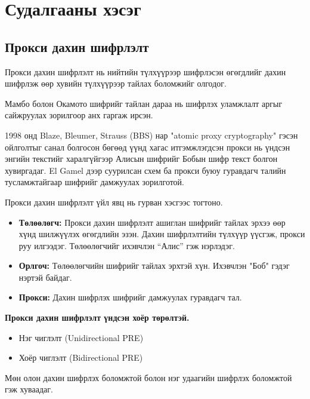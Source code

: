 \chapter{Судалгааны хэсэг}
\label{Chapter2} %
\pagecolor{white}

\section{Прокси дахин шифрлэлт}
Прокси дахин шифрлэлт нь нийтийн түлхүүрээр шифрлэсэн өгөгдлийг дахин шифрлэж өөр хувийн түлхүүрээр тайлах боломжийг олгодог.

Мамбо болон Окамото шифрийг тайлан дараа нь шифрлэх уламжлалт аргыг сайжруулах зорилгоор анх гаргаж ирсэн.

1998 онд Blaze, Bleumer, Strauss (BBS) нар "atomic proxy cryptography" гэсэн ойлголтыг санал болгосон бөгөөд үүнд хагас итгэмжлэгдсэн прокси нь үндсэн энгийн текстийг харалгүйгээр Алисын шифрийг Бобын шифр текст болгон хувиргадаг. El Gamel дээр суурилсан схем ба прокси буюу гуравдагч талийн тусламжтайгаар шифрийг дамжуулах зорилготой. \cite{ateniese2005improved}

Прокси дахин шифрлэлт үйл явц нь гурван хэсгээс тогтоно.
\begin{itemize}
    \item \textbf{Төлөөлөгч:} Прокси дахин шифрлэлт ашиглан шифрийг тайлах эрхээ өөр хүнд шилжүүлэх өгөгдлийн эзэн. Дахин шифрлэлтийн түлхүүр үүсгэж, прокси руу илгээдэг. Төлөөлөгчийг ихэвчлэн “Алис” гэж нэрлэдэг.
    \item \textbf{Орлгоч:} Төлөөлөгчийн шифрийг тайлах эрхтэй хүн. Ихэвчлэн "Боб" гэдэг нэртэй байдаг.
    \item \textbf{Прокси:} Дахин шифрлэх шифрийг дамжуулах гуравдагч тал.
\end{itemize}

\textbf{Прокси дахин шифрлэлт үндсэн хоёр төрөлтэй.}
\begin{itemize}
    \item Нэг чиглэлт (Unidirectional PRE)
    \item Хоёр чиглэлт (Bidirectional PRE)
\end{itemize}
Мөн олон дахин шифрлэх боломжтой болон нэг удаагийн шифрлэх боломжтой гэж хуваадаг.

